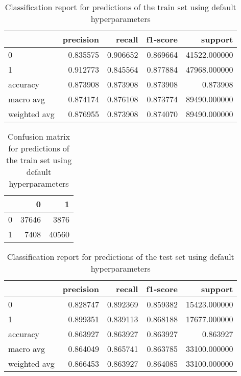\documentclass{article}
\begin{document}
\begin{itemize}
\begin{table}[h!]
\centering
\begin{tabular}{lrrrr}
\toprule
{} &  precision &    recall &  f1-score &       support \\
\midrule
0            &   0.835575 &  0.906652 &  0.869664 &  41522.000000 \\
1            &   0.912773 &  0.845564 &  0.877884 &  47968.000000 \\
accuracy     &   0.873908 &  0.873908 &  0.873908 &      0.873908 \\
macro avg    &   0.874174 &  0.876108 &  0.873774 &  89490.000000 \\
weighted avg &   0.876955 &  0.873908 &  0.874070 &  89490.000000 \\
\bottomrule
\end{tabular}

\caption{Classification report for predictions of the train set using default hyperparameters}
\label{table:model_tr_cr}
\end{table}

\begin{table}[h!]
\centering
\begin{tabular}{lrr}
\toprule
{} &      0 &      1 \\
\midrule
0 &  37646 &   3876 \\
1 &   7408 &  40560 \\
\bottomrule
\end{tabular}
\caption{Confusion matrix for predictions of the train set using default hyperparameters}
\label{table:model_tr_cm}
\end{table}

\begin{table}[h!]
\centering
\begin{tabular}{lrrrr}
\toprule
{} &  precision &    recall &  f1-score &       support \\
\midrule
0            &   0.828747 &  0.892369 &  0.859382 &  15423.000000 \\
1            &   0.899351 &  0.839113 &  0.868188 &  17677.000000 \\
accuracy     &   0.863927 &  0.863927 &  0.863927 &      0.863927 \\
macro avg    &   0.864049 &  0.865741 &  0.863785 &  33100.000000 \\
weighted avg &   0.866453 &  0.863927 &  0.864085 &  33100.000000 \\
\bottomrule
\end{tabular}
\caption{Classification report for predictions of the test set using default hyperparameters}
\label{table:model_te_cr}
\end{table}
 

\end{itemize}
\end{document}
